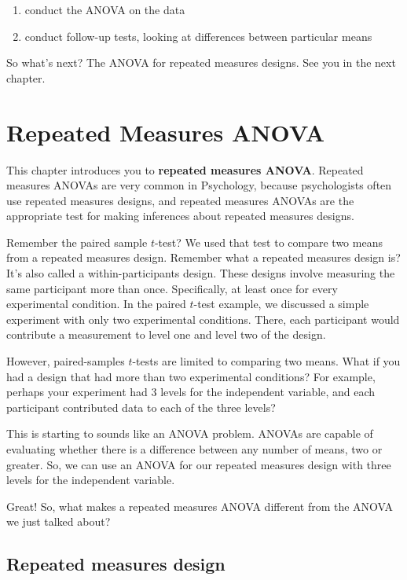 \documentclass[
]{book}
\providecommand{\tightlist}{%
  \setlength{\itemsep}{0pt}\setlength{\parskip}{0pt}}
\begin{document}
\begin{enumerate}
\def\labelenumi{\arabic{enumi})}
\tightlist
\item
  conduct the ANOVA on the data
\item
  conduct follow-up tests, looking at differences between particular means
\end{enumerate}

So what's next? The ANOVA for repeated measures designs. See you in the next chapter.

\chapter{Repeated Measures ANOVA}\label{repeated-measures-anova}

This chapter introduces you to \textbf{repeated measures ANOVA}. Repeated measures ANOVAs are very common in Psychology, because psychologists often use repeated measures designs, and repeated measures ANOVAs are the appropriate test for making inferences about repeated measures designs.

Remember the paired sample \(t\)-test? We used that test to compare two means from a repeated measures design. Remember what a repeated measures design is? It's also called a within-participants design. These designs involve measuring the same participant more than once. Specifically, at least once for every experimental condition. In the paired \(t\)-test example, we discussed a simple experiment with only two experimental conditions. There, each participant would contribute a measurement to level one and level two of the design.

However, paired-samples \(t\)-tests are limited to comparing two means. What if you had a design that had more than two experimental conditions? For example, perhaps your experiment had 3 levels for the independent variable, and each participant contributed data to each of the three levels?

This is starting to sounds like an ANOVA problem. ANOVAs are capable of evaluating whether there is a difference between any number of means, two or greater. So, we can use an ANOVA for our repeated measures design with three levels for the independent variable.

Great! So, what makes a repeated measures ANOVA different from the ANOVA we just talked about?

\section{Repeated measures design}\label{repeated-measures-design}
\end{document}

